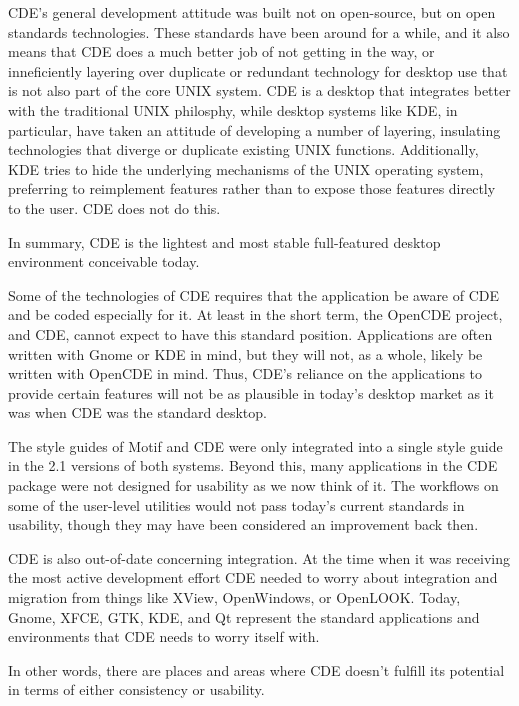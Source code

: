 CDE’s general development attitude was built not on open-source, but on
open standards technologies. These standards have been around for a
while, and it also means that CDE does a much better job of not getting
in the way, or inneficiently layering over duplicate or redundant
technology for desktop use that is not also part of the core UNIX
system. CDE is a desktop that integrates better with the traditional
UNIX philosphy, while desktop systems like KDE, in particular, have
taken an attitude of developing a number of layering, insulating
technologies that diverge or duplicate existing UNIX functions.
Additionally, KDE tries to hide the underlying mechanisms of the UNIX
operating system, preferring to reimplement features rather than to
expose those features directly to the user. CDE does not do this. 

In summary, CDE is the lightest and most stable full-featured desktop
environment conceivable today.


Some of the technologies of CDE requires that the application be aware
of CDE and be coded especially for it. At least in the short term, the
OpenCDE project, and CDE, cannot expect to have this standard position.
Applications are often written with Gnome or KDE in mind, but they will
not, as a whole, likely be written with OpenCDE in mind. Thus, CDE’s
reliance on the applications to provide certain features will not be as
plausible in today’s desktop market as it was when CDE was the standard
desktop.

The style guides of Motif and CDE were only integrated into a single
style guide in the 2.1 versions of both systems. Beyond this, many
applications in the CDE package were not designed for usability as we
now think of it. The workflows on some of the user-level utilities would
not pass today's current standards in usability, though they may have
been considered an improvement back then.

CDE is also out-of-date concerning integration. At the time when it was
receiving the most active development effort CDE needed to worry about
integration and migration from things like XView, OpenWindows, or
OpenLOOK. Today, Gnome, XFCE, GTK, KDE, and Qt represent the standard
applications and environments that CDE needs to worry itself with. 

In other words, there are places and areas where CDE doesn't fulfill its
potential in terms of either consistency or usability. 

